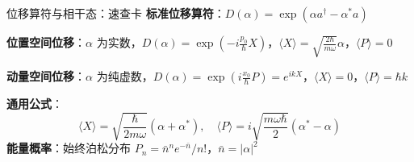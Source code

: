 \begin{cheatbox}{位移算符与相干态：速查卡}
\textbf{标准位移算符}：$D(\alpha)=\exp(\alpha a^\dagger - \alpha^* a)$

\textbf{位置空间位移}：$\alpha$ 为实数，$D(\alpha)=\exp(-i\frac{p_0}{\hbar}X)$，$\langle X\rangle = \sqrt{\frac{2\hbar}{m\omega}}\alpha$，$\langle P\rangle=0$

\textbf{动量空间位移}：$\alpha$ 为纯虚数，$D(\alpha)=\exp(i\frac{x_0}{\hbar}P)=e^{ikX}$，$\langle X\rangle=0$，$\langle P\rangle=\hbar k$

\textbf{通用公式}：
\[
  \langle X\rangle = \sqrt{\frac{\hbar}{2m\omega}}(\alpha+\alpha^*), \quad
  \langle P\rangle = i\sqrt{\frac{m\omega\hbar}{2}}(\alpha^*-\alpha)
\]
\textbf{能量概率}：始终泊松分布 $P_n = \bar{n}^n e^{-\bar{n}}/n!$，$\bar{n}=|\alpha|^2$
\end{cheatbox}

